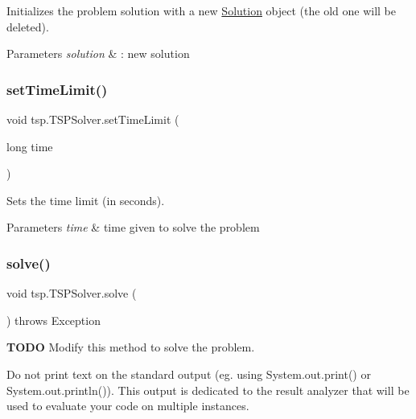 Initializes the problem solution with a new \mbox{\hyperlink{classtsp_1_1_solution}{Solution}} object (the old one will be deleted). 
\begin{DoxyParams}{Parameters}
{\em solution} & \+: new solution \\
\hline
\end{DoxyParams}
\mbox{\label{classtsp_1_1_t_s_p_solver_a13dec1ff9423995aa911859122b416a9}} 
\subsubsection{\texorpdfstring{set\+Time\+Limit()}{setTimeLimit()}}
{\footnotesize\ttfamily void tsp.\+T\+S\+P\+Solver.\+set\+Time\+Limit (\begin{DoxyParamCaption}\item[{long}]{time }\end{DoxyParamCaption})\hspace{0.3cm}{\ttfamily [inline]}}

Sets the time limit (in seconds). 
\begin{DoxyParams}{Parameters}
{\em time} & time given to solve the problem \\
\hline
\end{DoxyParams}
\mbox{\label{classtsp_1_1_t_s_p_solver_a9d4e4f4559a537b2af395fb8ab930906}} 
\subsubsection{\texorpdfstring{solve()}{solve()}}
{\footnotesize\ttfamily void tsp.\+T\+S\+P\+Solver.\+solve (\begin{DoxyParamCaption}{ }\end{DoxyParamCaption}) throws Exception\hspace{0.3cm}{\ttfamily [inline]}}

{\bfseries T\+O\+DO} Modify this method to solve the problem.

Do not print text on the standard output (eg. using {\ttfamily System.\+out.\+print()} or {\ttfamily System.\+out.\+println()}). This output is dedicated to the result analyzer that will be used to evaluate your code on multiple instances.

